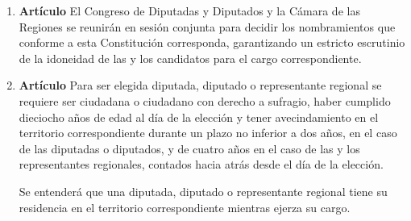 \documentclass[11pt, a4paper]{article}
\begin{document}
\begin{enumerate}
\item \textbf{Artículo} \newline
El Congreso de Diputadas y Diputados y la Cámara de las Regiones se reunirán en sesión conjunta para decidir los nombramientos que conforme a esta Constitución corresponda, garantizando un estricto escrutinio de la idoneidad de las y los candidatos para el cargo correspondiente. 


\item \textbf{Artículo} \newline
Para ser elegida diputada, diputado o representante regional se requiere ser ciudadana o ciudadano con derecho a sufragio, haber cumplido dieciocho años de edad al día de la elección y tener avecindamiento en el territorio correspondiente durante un plazo no inferior a dos años, en el caso de las diputadas o diputados, y de cuatro años en el caso de las y los representantes regionales, contados hacia atrás desde el día de la elección. 

Se entenderá que una diputada, diputado o representante regional tiene su residencia en el territorio correspondiente mientras ejerza su cargo. 



\end{enumerate}
\end{document}
